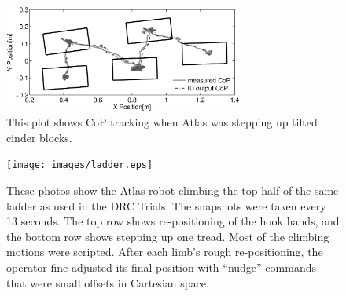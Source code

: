 \documentclass{ws-ijhr}
\begin{document}
\begin{figure}
  \begin{center}
    \includegraphics[width=0.7\textwidth]{images/cop_gray.eps} 
    \caption{
      This plot shows CoP tracking when Atlas was stepping up tilted cinder blocks.}

    \label{fig:walk_cop} 
  \end{center}
\end{figure}    

\begin{figure}
  \begin{center}
    {\texttt{[image: images/ladder.eps]}}
    \caption{
      These photos show the Atlas robot climbing the top half of the same 
      ladder as used in the DRC Trials. 
			The snapshots were taken every 13 seconds. 
			The top row shows re-positioning of the hook hands, 
			and the bottom row shows stepping up one tread. 
			Most of the climbing motions were scripted. 
			After each limb's rough re-positioning, the operator fine adjusted
			its final position with ``nudge'' commands that were small offsets 
			in Cartesian space. 
      }\label{fig:ladder_pic} 
  \end{center}
\end{figure}    
\end{document}
